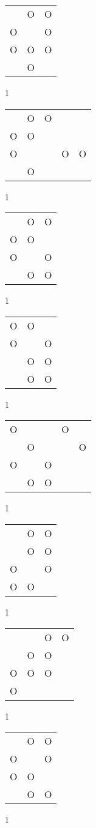 \begin{tabular}{|m{0.2cm}m{0.2cm}m{0.2cm}|}\hline
 &O&O\\
O& &O\\
O&O&O\\
 &O& \\
\hline\end{tabular}1
\begin{tabular}{|m{0.2cm}m{0.2cm}m{0.2cm}m{0.2cm}m{0.2cm}|}\hline
 &O&O& & \\
O&O& & & \\
O& & &O&O\\
 &O& & & \\
\hline\end{tabular}1
\begin{tabular}{|m{0.2cm}m{0.2cm}m{0.2cm}|}\hline
 &O&O\\
O&O& \\
O& &O\\
 &O&O\\
\hline\end{tabular}1
\begin{tabular}{|m{0.2cm}m{0.2cm}m{0.2cm}|}\hline
O&O& \\
O& &O\\
 &O&O\\
 &O&O\\
\hline\end{tabular}1
\begin{tabular}{|m{0.2cm}m{0.2cm}m{0.2cm}m{0.2cm}m{0.2cm}|}\hline
O& & &O& \\
 &O& & &O\\
O& &O& & \\
 &O&O& & \\
\hline\end{tabular}1
\begin{tabular}{|m{0.2cm}m{0.2cm}m{0.2cm}|}\hline
 &O&O\\
 &O&O\\
O& &O\\
O&O& \\
\hline\end{tabular}1
\begin{tabular}{|m{0.2cm}m{0.2cm}m{0.2cm}m{0.2cm}|}\hline
 & &O&O\\
 &O&O& \\
O&O&O& \\
O& & & \\
\hline\end{tabular}1
\begin{tabular}{|m{0.2cm}m{0.2cm}m{0.2cm}|}\hline
 &O&O\\
O& &O\\
O&O& \\
 &O&O\\
\hline\end{tabular}1
